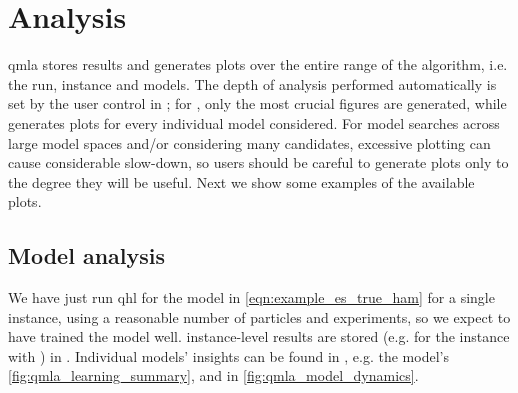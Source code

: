 \section{Analysis}
\gls{qmla} stores results and generates plots
    over the entire range of the algorithm\footnotemark, i.e. the \gls{run}, \gls{instance} and models. 
The depth of analysis performed automatically is set by the user control  in ;
    for , only the most crucial figures are generated, while  generates plots for every individual 
    model considered. 
For model searches across large model spaces and/or considering many candidates,
    excessive plotting can cause considerable slow-down, so users should be careful to generate plots only 
    to the degree they will be useful. 
Next we show some examples of the available plots. 
\par 

\subsection{Model analysis}

We have just run \acrfull{qhl} for the model in \cref{eqn:example_es_true_ham} for a single instance, 
    using a reasonable number of particles and \glspl{experiment}, so we expect to have trained the model well. 
\Gls{instance}-level results are stored (e.g. for the instance with ) in .
Individual models' insights can be found in , 
    e.g. the model's  \cref{fig:qmla_learning_summary}, and  in \cref{fig:qmla_model_dynamics}.
\par 

